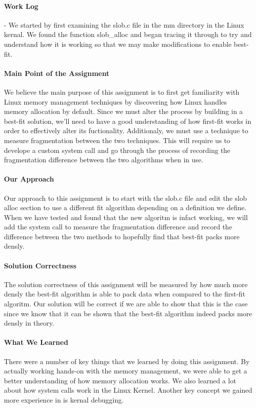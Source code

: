 \documentclass[titlepage,draftclsnofoot,onecolumn]{article}
\begin{document}
\paragraph{Work Log}
- We started by first examining the slob.c file in the mm directory in the Linux kernal. We found the function slob\_alloc and began tracing it through to try and understand how it is working so that we may make modifications to enable best-fit.

\paragraph{Main Point of the Assignment}
We believe the main purpose of this assignment is to first get familiarity with Linux memory management techniques by discovering how Linux handles memory allocation by default. Since we must alter the process by building in a best-fit solution, we'll need to have a good understanding of how first-fit works in order to effectively alter its fuctionality. Additionaly, we must use a technique to measure fragmentation between the two techniques. This will require us to develope a custom system call and go through the process of recording the fragmentation difference between the two algorithms when in use.

\paragraph{Our Approach}
Our approach to this assignment is to start with the slob.c file and edit the slob alloc section to use a different fit algorithm depending on a definition we define. When we have tested and found that the new algoritm is infact working, we will add the system call to measure the fragmentation difference and record the difference between the two methods to hopefully find that best-fit packs more densly.

\paragraph{Solution Correctness}
The solution correctness of this assignment will be measured by how much more densly the best-fit algorithm is able to pack data when compared to the first-fit algoritm. Our solution will be correct if we are able to show that this is the case since we know that it can be shown that the best-fit algorithm indeed packs more densly in theory.

\paragraph{What We Learned}
There were a number of key things that we learned by doing this assignment. By actually working hands-on with the memory management, we were able to get a better understanding of how memory allocation works. We also learned a lot about how system calls work in the Linux Kernel. Another key concept we gained more experience in is kernal debugging.
\end{document}
